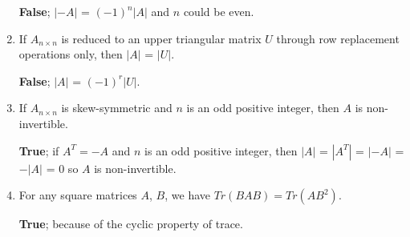 \documentclass{zc-ust-hw}
\begin{document}
\begin{enumerate}[label=\roman*.]
    \begin{center}
      \textbf{False}; $|-A|$ = $(-1)^n|A|$ and $n$ could be even.
    \qedsymbol\end{center}
  \item If $A_{n\times n}$ is reduced to an upper triangular matrix $U$ through row replacement operations only, then $|A|$ = $|U|$. 
    \begin{center}
      \textbf{False}; $|A|$ = $(-1)^r|U|$.
    \qedsymbol\end{center}
  \item If $A_{n\times n}$ is skew-symmetric and $n$ is an odd positive integer,
    then $A$ is non-invertible. 
    \begin{center}
      \textbf{True}; if $A^T=-A$ and $n$ is an odd positive integer, then $|A|$ =
      $|A^T|$ = $|-A|$ = $-|A|$ = $0$ so $A$ is non-invertible.
    \qedsymbol\end{center}
  \item For any square matrices $A$, $B$, we have $Tr(BAB)=Tr(AB^2)$.  
    \begin{center}
      \textbf{True}; because of the cyclic property of trace.
    \qedsymbol\end{center}
\end{enumerate}
\end{document}
